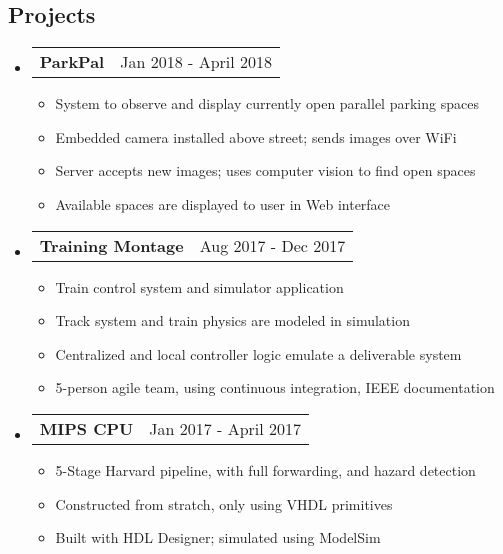 \documentclass[18pt]{article}
\makeatletter
\providecommand{\tightlist}{
    \setlength{\itemsep}{0pt}\setlength{\parskip}{0pt}
}
\providecommand{\datetable}[2]{
    \begin{tabular*}{\textwidth}{@{}r @{\extracolsep{\fill}} l}
        #1 & #2
    \end{tabular*}
}
\makeatother
\begin{document}
    \subsection*{Projects}\label{projects}
    \begin{itemize}[label={}]\tightlist

        \item \datetable{\textbf{ParkPal}}
        {Jan 2018 - April 2018}
        \begin{itemize}\tightlist
            \item System to observe and display currently open parallel parking spaces
            \item Embedded camera installed above street; sends images over WiFi
            \item Server accepts new images; uses computer vision to find open spaces
            \item Available spaces are displayed to user in Web interface
        \end{itemize}

        \item \datetable{\textbf{Training Montage}}
        {Aug 2017 - Dec 2017}
        \begin{itemize}\tightlist
            \item Train control system and simulator application
            \item Track system and train physics are modeled in simulation
            \item Centralized and local controller logic emulate a deliverable system
            \item 5-person agile team, using continuous integration, IEEE documentation
        \end{itemize}
            
        \item \datetable{\textbf{MIPS CPU}}{Jan 2017 - April 2017}
        \begin{itemize}\tightlist
            \item 5-Stage Harvard pipeline, with full forwarding, and hazard detection
            \item Constructed from stratch, only using VHDL primitives
            \item Built with HDL Designer; simulated using ModelSim
        \end{itemize}

    \end{itemize}
\end{document}
